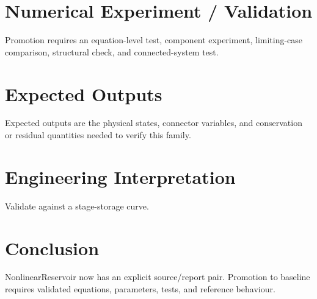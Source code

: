 \documentclass[10pt,a4paper]{article}
\begin{document}
\section{Numerical Experiment / Validation}
Promotion requires an equation-level test, component experiment, limiting-case comparison, structural check, and connected-system test.
\section{Expected Outputs}
Expected outputs are the physical states, connector variables, and conservation or residual quantities needed to verify this family.
\section{Engineering Interpretation}
Validate against a stage-storage curve.
\section*{Conclusion}
NonlinearReservoir now has an explicit source/report pair. Promotion to baseline requires validated equations, parameters, tests, and reference behaviour.
\end{document}
